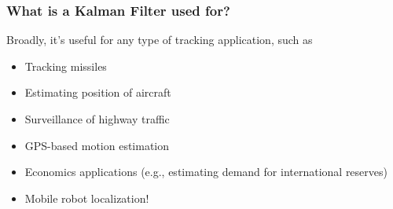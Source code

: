 \documentclass{beamer}
\begin{document}
\begin{frame}
	\frametitle{What is a Kalman Filter used for?}
	Broadly, it’s useful for any type of tracking application, such as
	\begin{itemize}
		\item Tracking missiles
		\item Estimating position of aircraft
		\item Surveillance of highway traffic
		\item GPS-based motion estimation
		\item Economics applications (e.g., estimating demand for international reserves)
		\item Mobile robot localization!
	\end{itemize}
\end{frame}



%
\end{document}
